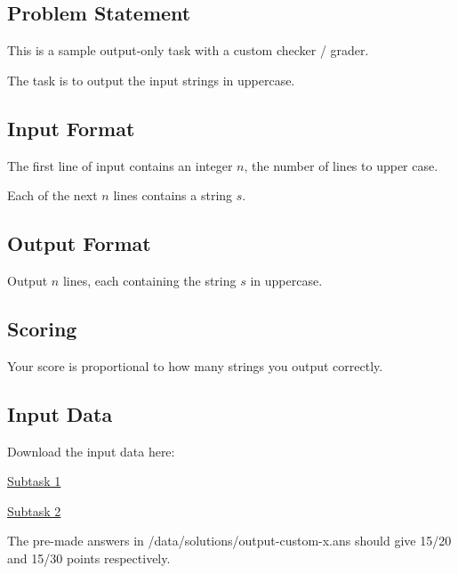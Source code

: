 \subsection*{Problem Statement}

This is a sample output-only task with a custom checker / grader.

The task is to output the input strings in uppercase.

\subsection*{Input Format}

The first line of input contains an integer \(n\), the number of lines to upper case.

Each of the next \(n\) lines contains a string \(s\).

\subsection*{Output Format}

Output \(n\) lines, each containing the string \(s\) in uppercase.

\subsection*{Scoring}

Your score is proportional to how many strings you output correctly.

\subsection*{Input Data}

Download the input data here:

\href{/tasks/output-custom/attachments/output-custom-1.in}{Subtask 1}

\href{/tasks/output-custom/attachments/output-custom-2.in}{Subtask 2}

The pre-made answers in /data/solutions/output-custom-x.ans should give 15/20 and 15/30 points respectively.
